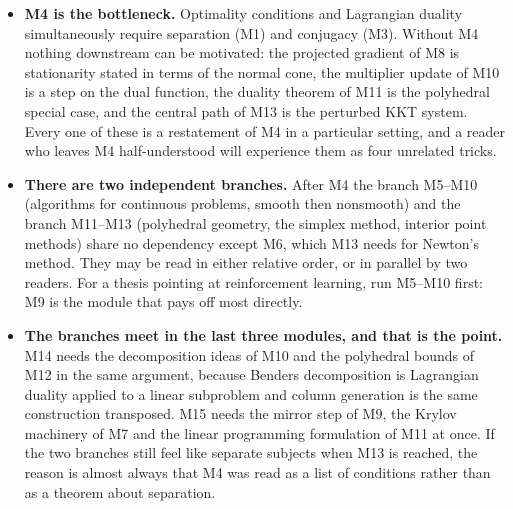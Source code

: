 \documentclass[11pt,a4paper]{article}
\begin{document}
\begin{itemize}
\item \textbf{M4 is the bottleneck.} Optimality conditions and Lagrangian duality
simultaneously require separation (M1) and conjugacy (M3). Without M4 nothing downstream can
be motivated: the projected gradient of M8 is stationarity stated in terms of the normal
cone, the multiplier update of M10 is a step on the dual function, the duality theorem of M11
is the polyhedral special case, and the central path of M13 is the perturbed KKT system.
Every one of these is a restatement of M4 in a particular setting, and a reader who leaves M4
half-understood will experience them as four unrelated tricks.

\item \textbf{There are two independent branches.} After M4 the branch M5--M10 (algorithms
for continuous problems, smooth then nonsmooth) and the branch M11--M13 (polyhedral geometry,
the simplex method, interior point methods) share no dependency except M6, which M13 needs
for Newton's method. They may be read in either relative order, or in parallel by two
readers. For a thesis pointing at reinforcement learning, run M5--M10 first: M9 is the module
that pays off most directly.

\item \textbf{The branches meet in the last three modules, and that is the point.} M14 needs
the decomposition ideas of M10 and the polyhedral bounds of M12 in the same argument, because
Benders decomposition is Lagrangian duality applied to a linear subproblem and column
generation is the same construction transposed. M15 needs the mirror step of M9, the
Krylov machinery of M7 and the linear programming formulation of M11 at once. If the two
branches still feel like separate subjects when M13 is reached, the reason is almost always
that M4 was read as a list of conditions rather than as a theorem about separation.
\end{itemize}
\end{document}
